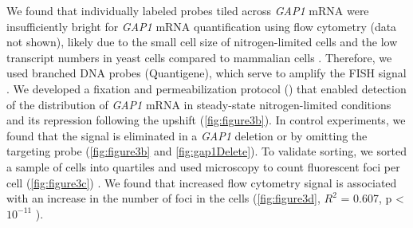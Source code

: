 

We found that
individually labeled probes tiled across \textit{GAP1} mRNA
\parencite{raj2008imaging} were insufficiently bright for
\textit{GAP1} mRNA quantification using flow cytometry (data not shown),
likely due to the small cell size of nitrogen-limited cells and the
low transcript numbers in yeast cells compared to mammalian cells
\parencite{klemm2014transcriptional}. Therefore, we used branched DNA probes
(Quantigene), which serve to amplify the FISH signal
\parencite{hanley2013detection}. We developed a fixation and permeabilization
protocol () that enabled detection of the
distribution of  \textit{GAP1} mRNA in steady-state nitrogen-limited conditions
and its repression following the  upshift (\autoref{fig:figure3b}). In control
experiments, we found that the signal is eliminated in a \textit{GAP1} deletion
or by omitting the targeting probe %
(\autoref{fig:figure3b} and \autoref{fig:gap1Delete}). To validate
sorting, we sorted a sample of cells into quartiles and used
microscopy to count fluorescent foci per cell
(\autoref{fig:figure3c}) .
We found that increased flow cytometry signal is associated with an
increase in the number of foci in the cells (\autoref{fig:figure3d}, $R^2$ = 0.607,
p < $10^{-11}$ ). 



